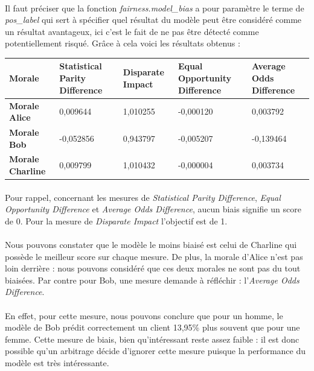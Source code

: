 \documentclass[10pt, french, a4paper]{report}
\begin{document}
\paragraph{}
Il faut préciser que la fonction \textit{fairness.model\_bias} a pour paramètre le terme de \textit{pos\_label} qui sert à spécifier quel résultat du modèle peut être considéré comme un résultat avantageux, ici c'est le fait de ne pas être détecté comme potentiellement risqué. Grâce à cela voici les résultats obtenus :

\begin{center}
  \begin{tabularx}{13cm}{ |l|X|X|X|X| } 
    \hline 
     Morale & Statistical Parity Difference & Disparate Impact & Equal Opportunity Difference & Average Odds Difference \\
    \hline
    \hline
    \textbf{Morale Alice} & 0,009644 & 1,010255 & -0,000120 & 0,003792 \\
    \textbf{Morale Bob} & -0,052856 & 0,943797 & -0,005207 & -0,139464\\
    \textbf{Morale Charline} & 0,009799 & 1,010432 & -0,000004 & 0,003734 \\
    \hline
  \end{tabularx}
\end{center}

\paragraph{}
Pour rappel, concernant les mesures de \textit{Statistical Parity Difference}, \textit{Equal Opportunity Difference} et \textit{Average Odds Difference}, aucun biais signifie un score de 0. Pour la mesure de \textit{Disparate Impact} l'objectif est de 1.

\paragraph{}
Nous pouvons constater que le modèle le moins biaisé est celui de Charline qui possède le meilleur score sur chaque mesure. De plus, la morale d'Alice n'est pas loin derrière : nous pouvons considéré que ces deux morales ne sont pas du tout biaisées. Par contre pour Bob, une mesure demande à réfléchir : l'\textit{Average Odds Difference}.

\paragraph{}
En effet, pour cette mesure, nous pouvons conclure que pour un homme, le modèle de Bob prédit correctement un client 13,95\% plus souvent que pour une femme. Cette mesure de biais, bien qu'intéressant reste assez faible : il est donc possible qu'un arbitrage décide d'ignorer cette mesure puisque la performance du modèle est très intéressante. 
\end{document}
